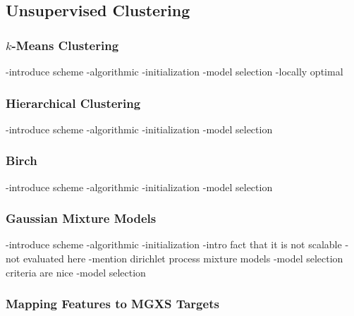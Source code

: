 \subsection{Unsupervised Clustering}
\label{subsec:chap10-feature-mapping}

\subsubsection{$k$-Means Clustering}
\label{subsubsec:chap10-kmeans}

-introduce scheme
-algorithmic
-initialization
-model selection
-locally optimal

\subsubsection{Hierarchical Clustering}
\label{subsubsec:chap10-agglomerative}

-introduce scheme
-algorithmic
-initialization
-model selection

\subsubsection{Birch}
\label{subsubsec:chap10-birch}

-introduce scheme
-algorithmic
-initialization
-model selection

\subsubsection{Gaussian Mixture Models}
\label{subsubsec:chap10-gmms}

-introduce scheme
-algorithmic
-initialization
-intro fact that it is not scalable - not evaluated here
-mention dirichlet process mixture models
-model selection criteria are nice
-model selection

\subsubsection{Mapping Features to MGXS Targets}
\label{subsubsec:chap10-feature-mapping}



